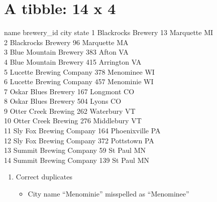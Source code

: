 \documentclass[]{article}
\newenvironment{Shaded}{\begin{snugshade}}{\end{snugshade}}
\newcommand{\KeywordTok}[1]{\textcolor[rgb]{0.13,0.29,0.53}{\textbf{#1}}}
\newcommand{\DataTypeTok}[1]{\textcolor[rgb]{0.13,0.29,0.53}{#1}}
\newcommand{\DecValTok}[1]{\textcolor[rgb]{0.00,0.00,0.81}{#1}}
\newcommand{\StringTok}[1]{\textcolor[rgb]{0.31,0.60,0.02}{#1}}
\newcommand{\CommentTok}[1]{\textcolor[rgb]{0.56,0.35,0.01}{\textit{#1}}}
\newcommand{\OperatorTok}[1]{\textcolor[rgb]{0.81,0.36,0.00}{\textbf{#1}}}
\newcommand{\NormalTok}[1]{#1}
\providecommand{\tightlist}{%
  \setlength{\itemsep}{0pt}\setlength{\parskip}{0pt}}
\begin{document}
\section{A tibble: 14 x 4}\label{a-tibble-14-x-4}

name brewery\_id city state 1 Blackrocks Brewery 13 Marquette MI\\
2 Blackrocks Brewery 96 Marquette MA\\
3 Blue Mountain Brewery 383 Afton VA\\
4 Blue Mountain Brewery 415 Arrington VA\\
5 Lucette Brewing Company 378 Menominee WI\\
6 Lucette Brewing Company 457 Menominie WI\\
7 Oskar Blues Brewery 167 Longmont CO\\
8 Oskar Blues Brewery 504 Lyons CO\\
9 Otter Creek Brewing 262 Waterbury VT\\
10 Otter Creek Brewing 276 Middlebury VT\\
11 Sly Fox Brewing Company 164 Phoenixville PA\\
12 Sly Fox Brewing Company 372 Pottstown PA\\
13 Summit Brewing Company 59 St Paul MN\\
14 Summit Brewing Company 139 St Paul MN

\begin{enumerate}
\def\labelenumi{\arabic{enumi})}
\setcounter{enumi}{3}
\item
  Correct duplicates

  \begin{itemize}
  \tightlist
  \item
    City name ``Menominie'' misspelled as ``Menominee''
  \end{itemize}
\end{enumerate}

\begin{Shaded}
\end{Shaded}
\end{document}
